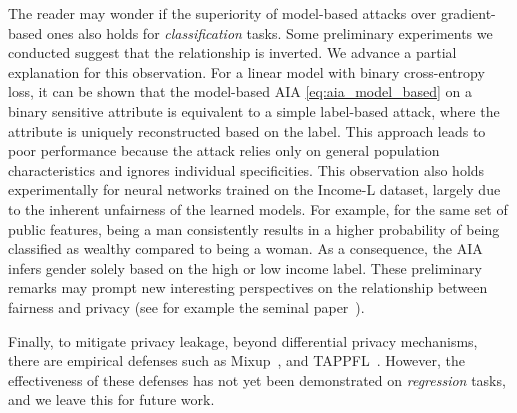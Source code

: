 The reader may wonder if the superiority of model-based attacks over gradient-based ones also holds for \emph{classification} tasks. Some preliminary experiments we conducted suggest that the relationship is inverted. We advance a partial explanation for this observation.
 For a linear model with binary cross-entropy loss, it can be shown that the model-based AIA \eqref{eq:aia_model_based} on a binary sensitive attribute is equivalent to a simple label-based attack, where the attribute is uniquely reconstructed based on the label. This approach leads to poor performance because the attack relies only on general population characteristics and ignores individual specificities.
This observation also holds experimentally for neural networks trained on the Income-L dataset, largely due to the inherent unfairness of the learned models. For example, for the same set of public features, being a man consistently results in a higher probability of being classified as wealthy compared to being a woman. As a consequence, the AIA infers gender solely based on the high or low income label. These preliminary remarks may prompt new interesting perspectives on the relationship between fairness and privacy (see for example the seminal paper~\cite{chang2021privacy}).

Finally, to mitigate privacy leakage, beyond differential privacy mechanisms, there are empirical defenses such as Mixup~\cite{mixup}, and TAPPFL~\cite{aaai_defense}. However, the effectiveness of these defenses has not yet been demonstrated on \emph{regression} tasks, and we leave this for future work.
